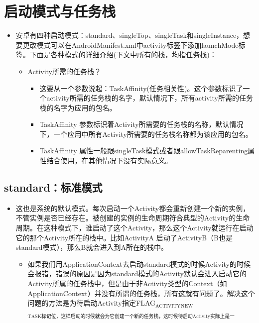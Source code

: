 \documentclass[9pt, b5paaper]{book}
\begin{document}
\chapter{启动模式与任务栈}
\label{sec-4}
\begin{itemize}
\item 安卓有四种启动模式：standard、singleTop、singleTask和singleInstance，想要更改模式可以在AndroidManifest.xml中activity标签下添加launchMode标签。下面是各种模式的详细介绍(下文中所有的栈，均指任务栈)：
\begin{itemize}
\item Activity所需的任务栈？
\begin{itemize}
\item 这要从一个参数说起：TaskAffinity(任务相关性)。这个参数标识了一个activity所需的任务栈的名字，默认情况下，所有activity所需的任务栈的名字为应用的包名。
\item TaskAffinity 参数标识着Activity所需要的任务栈的名称，默认情况下，一个应用中所有Activity所需要的任务栈名称都为该应用的包名。
\item TaskAffinity 属性一般跟singleTask模式或者跟allowTaskReparenting属性结合使用，在其他情况下没有实际意义。
\end{itemize}
\end{itemize}
\end{itemize}

\section{standard：标准模式}
\label{sec-4-1}
\begin{itemize}
\item 这也是系统的默认模式。每次启动一个Activity都会重新创建一个新的实例，不管实例是否已经存在。被创建的实例的生命周期符合典型的Activity的生命周期。在这种模式下，谁启动了这个Activity，那么这个Activity就运行在启动它的那个Activity所在的栈中。比如ActivityA 启动了ActivityB（B也是standard模式），那么B就会进入到A所在的栈中。
\begin{itemize}
\item 如果我们用ApplicationContext去启动standard模式的时候Activity的时候会报错，错误的原因是因为standard模式的Activity默认会进入启动它的Activity所属的任务栈中，但是由于非Activity类型的Context（如ApplicationContext）并没有所谓的任务栈，所有这就有问题了。解决这个问题的方法是为待启动Activity指定FLAG$_{\text{ACTIVITY}}$$_{\text{NEW}}$$_{\text{TASK标记位，这样启动的时候就会为它创建一个新的任务栈，这时候待启动Activity实际上是一singleTask模式启动的。后文会再次强调一下}}$
\end{itemize}
\end{itemize}
\end{document}
